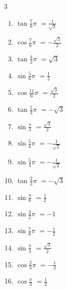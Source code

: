 \begin{multicols}{3}
\begin{enumerate}
  \item $\displaystyle \tan{\frac{7}{6}\pi}$
        $\displaystyle =\frac{1}{\sqrt{3}}$

  \item $\displaystyle \cos{\frac{7}{6}\pi}$
        $\displaystyle =-\frac{\sqrt{3}}{2}$

  \item $\displaystyle \tan{\frac{4}{3}\pi}$
        $\displaystyle =\sqrt{3}$

  \item $\displaystyle \sin{\frac{5}{6}\pi}$
        $\displaystyle =\frac{1}{2}$

  \item $\displaystyle \cos{\frac{11}{6}\pi}$
        $\displaystyle =\frac{\sqrt{3}}{2}$

  \item $\displaystyle \tan{\frac{5}{3}\pi}$
        $\displaystyle =-\sqrt{3}$

  \item $\displaystyle \sin{\frac{\pi}{3}}$
        $\displaystyle =\frac{\sqrt{3}}{2}$

  \item $\displaystyle \sin{\frac{5}{4}\pi}$
        $\displaystyle =-\frac{1}{\sqrt{2}}$

\columnbreak %

\resetques

  \item $\displaystyle \sin{\frac{5}{4}\pi}$
        $\displaystyle =-\frac{1}{\sqrt{2}}$

  \item $\displaystyle \tan{\frac{2}{3}\pi}$
        $\displaystyle =-\sqrt{3}$

  \item $\displaystyle \sin{\frac{\pi}{6}}$
        $\displaystyle =\frac{1}{2}$

  \item $\displaystyle \sin{\frac{3}{2}\pi}$
        $\displaystyle =-1$

  \item $\displaystyle \sin{\frac{7}{6}\pi}$
        $\displaystyle =-\frac{1}{2}$

  \item $\displaystyle \sin{\frac{\pi}{3}}$
        $\displaystyle =\frac{\sqrt{3}}{2}$

  \item $\displaystyle \cos{\frac{2}{3}\pi}$
        $\displaystyle =-\frac{1}{2}$

  \item $\displaystyle \cos{\frac{\pi}{3}}$
        $\displaystyle =\frac{1}{2}$


\end{enumerate}
\end{multicols}
